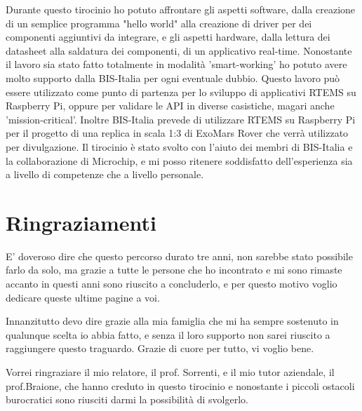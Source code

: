 \documentclass[12pt, a4paper, titlepage, oneside]{book}
\begin{document}
Durante questo tirocinio ho potuto affrontare gli aspetti software, dalla creazione di un semplice programma "hello world" alla creazione di driver per dei componenti aggiuntivi da integrare, e gli aspetti hardware, dalla lettura dei datasheet alla saldatura dei componenti, di un applicativo real-time.\newline
Nonostante il lavoro sia stato fatto totalmente in modalità 'smart-working' ho potuto avere molto supporto dalla BIS-Italia per ogni eventuale dubbio.\newline
Questo lavoro può essere utilizzato come punto di partenza per lo sviluppo di applicativi RTEMS su Raspberry Pi, oppure per validare le API in diverse casistiche, magari anche 'mission-critical'.\newline
Inoltre BIS-Italia prevede di utilizzare RTEMS su Raspberry Pi per il progetto di una replica in scala 1:3 di ExoMars Rover che verrà utilizzato per divulgazione.\newline
Il tirocinio è stato svolto con l'aiuto dei membri di BIS-Italia e la collaborazione di Microchip, e mi posso ritenere soddisfatto dell'esperienza sia a livello di competenze che a livello personale.\newline

\printbibliography



\chapter*{Ringraziamenti}

E' doveroso dire che questo percorso durato tre anni, non sarebbe stato possibile farlo da solo, ma grazie a tutte le persone che ho incontrato e mi sono rimaste accanto in questi anni sono riuscito a concluderlo, e per questo motivo voglio dedicare queste ultime pagine a voi.\newline


Innanzitutto devo dire grazie alla mia famiglia che mi ha sempre sostenuto in qualunque scelta io abbia fatto, e senza il loro supporto non sarei riuscito a raggiungere questo traguardo. Grazie di cuore per tutto, vi voglio bene.\newline


Vorrei ringraziare il mio relatore, il prof. Sorrenti, e il mio tutor aziendale, il prof.Braione, che hanno creduto in questo tirocinio e nonostante i piccoli ostacoli burocratici sono riusciti darmi la possibilità di svolgerlo.\newline
\end{document}
